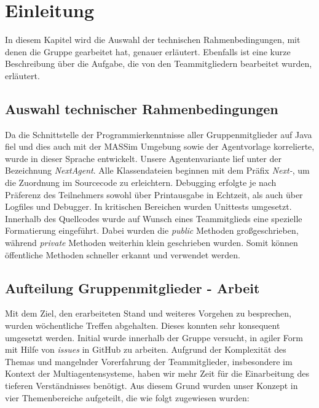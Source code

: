 \section{Einleitung}

In diesem Kapitel wird die Auswahl der technischen Rahmenbedingungen, mit denen die Gruppe gearbeitet hat, genauer erläutert. Ebenfalls ist eine kurze Beschreibung über die Aufgabe, die von den Teammitgliedern bearbeitet wurden, erläutert.

\subsection{Auswahl technischer Rahmenbedingungen}
Da die Schnittstelle der Programmierkenntnisse aller Gruppenmitglieder auf Java fiel und dies auch mit der MASSim Umgebung sowie der Agentvorlage korrelierte, wurde in dieser Sprache entwickelt. Unsere Agentenvariante lief unter der Bezeichnung \textit{NextAgent}.  Alle Klassendateien beginnen mit dem Präfix \textit{Next-}, um die Zuordnung im Sourcecode zu erleichtern. Debugging erfolgte je nach Präferenz des Teilnehmers sowohl über Printausgabe in Echtzeit, als auch über Logfiles und Debugger. In kritischen Bereichen wurden Unittests umgesetzt. \\

Innerhalb des Quellcodes wurde auf Wunsch eines Teammitglieds eine spezielle Formatierung eingeführt. Dabei wurden die \textit{public} Methoden großgeschrieben, während \textit{private} Methoden weiterhin klein geschrieben wurden. Somit können öffentliche Methoden schneller erkannt und verwendet werden.

\subsection{Aufteilung Gruppenmitglieder - Arbeit}

Mit dem Ziel, den erarbeiteten Stand und weiteres Vorgehen zu besprechen, wurden wöchentliche Treffen abgehalten. Dieses konnten sehr konsequent umgesetzt werden. Initial wurde innerhalb der Gruppe versucht, in agiler Form mit Hilfe von \textit{issues} in GitHub zu arbeiten. Aufgrund der Komplexität des Themas und mangelnder Vorerfahrung der Teammitglieder, insbesondere im Kontext der Multiagentensysteme, haben wir mehr Zeit für die Einarbeitung des tieferen Verständnisses benötigt. 
\newpage
Aus diesem Grund wurden unser Konzept in vier Themenbereiche aufgeteilt, die wie folgt zugewiesen wurden:

